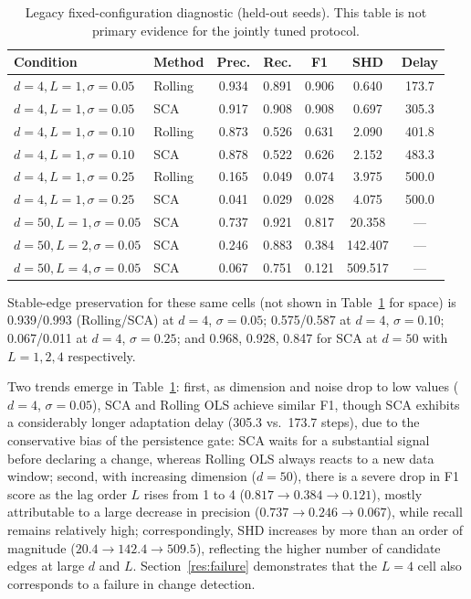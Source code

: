 \documentclass{ieeeaccess}
\begin{document}
\begin{table}[!t]
\caption{Legacy fixed-configuration diagnostic (held-out seeds). This table is not primary evidence for the jointly tuned protocol.}
\label{tab:factorial}
\centering
\footnotesize
\setlength{\tabcolsep}{3pt}
\begin{tabular}{llccccc}
\toprule
\textbf{Condition} & \textbf{Method} & \textbf{Prec.} & \textbf{Rec.} & \textbf{F1} & \textbf{SHD} & \textbf{Delay}\\
\midrule
$d{=}4,L{=}1,\sigma{=}0.05$ & Rolling & 0.934 & 0.891 & 0.906 & 0.640 & 173.7\\
$d{=}4,L{=}1,\sigma{=}0.05$ & SCA     & 0.917 & 0.908 & 0.908 & 0.697 & 305.3\\
\addlinespace[2pt]
$d{=}4,L{=}1,\sigma{=}0.10$ & Rolling & 0.873 & 0.526 & 0.631 & 2.090 & 401.8\\
$d{=}4,L{=}1,\sigma{=}0.10$ & SCA     & 0.878 & 0.522 & 0.626 & 2.152 & 483.3\\
\addlinespace[2pt]
$d{=}4,L{=}1,\sigma{=}0.25$ & Rolling & 0.165 & 0.049 & 0.074 & 3.975 & 500.0\\
$d{=}4,L{=}1,\sigma{=}0.25$ & SCA     & 0.041 & 0.029 & 0.028 & 4.075 & 500.0\\
\addlinespace[2pt]
$d{=}50,L{=}1,\sigma{=}0.05$ & SCA    & 0.737 & 0.921 & 0.817 & 20.358 & ---\\
$d{=}50,L{=}2,\sigma{=}0.05$ & SCA    & 0.246 & 0.883 & 0.384 & 142.407 & ---\\
$d{=}50,L{=}4,\sigma{=}0.05$ & SCA    & 0.067 & 0.751 & 0.121 & 509.517 & ---\\
\bottomrule
\end{tabular}
\end{table}

Stable-edge preservation for these same cells (not shown in Table~\ref{tab:factorial} for space) is 0.939/0.993 (Rolling/SCA) at $d=4$, $\sigma=0.05$; 0.575/0.587 at $d=4$, $\sigma=0.10$; 0.067/0.011 at $d=4$, $\sigma=0.25$; and 0.968, 0.928, 0.847 for SCA at $d=50$ with $L=1,2,4$ respectively.

Two trends emerge in Table~\ref{tab:factorial}: first, as dimension and noise drop to low values ($d=4$, $\sigma=0.05$), SCA and Rolling OLS achieve similar F1, though SCA exhibits a considerably longer adaptation delay (305.3 vs.\ 173.7 steps), due to the conservative bias of the persistence gate: SCA waits for a substantial signal before declaring a change, whereas Rolling OLS always reacts to a new data window; second, with increasing dimension ($d=50$), there is a severe drop in F1 score as the lag order $L$ rises from 1 to 4 ($0.817\to0.384\to0.121$), mostly attributable to a large decrease in precision ($0.737\to0.246\to0.067$), while recall remains relatively high; correspondingly, SHD increases by more than an order of magnitude ($20.4\to142.4\to509.5$), reflecting the higher number of candidate edges at large $d$ and $L$. Section~\ref{res:failure} demonstrates that the $L=4$ cell also corresponds to a failure in change detection.
\end{document}
